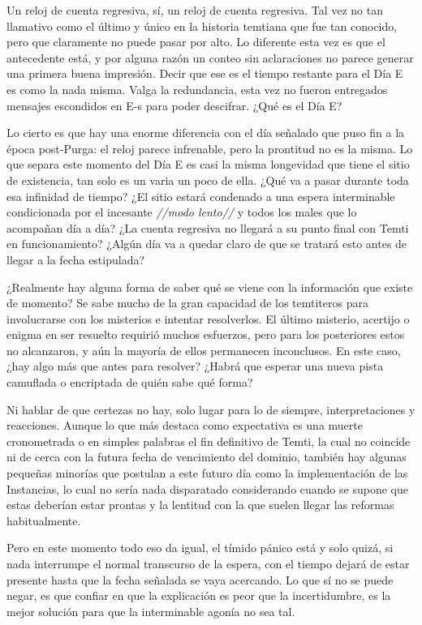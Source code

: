 \documentclass[
  spanish,
]{book}
\begin{document}
Un reloj de cuenta regresiva, sí, un reloj de cuenta regresiva. Tal vez no tan llamativo como el último y único en la historia temtiana que fue tan conocido, pero que claramente no puede pasar por alto. Lo diferente esta vez es que el antecedente está, y por alguna razón un conteo sin aclaraciones no parece generar una primera buena impresión. Decir que ese es el tiempo restante para el Día E es como la nada misma. Valga la redundancia, esta vez no fueron entregados mensajes escondidos en E-s para poder descifrar. ¿Qué es el Día E?

Lo cierto es que hay una enorme diferencia con el día señalado que puso fin a la época post-Purga: el reloj parece infrenable, pero la prontitud no es la misma. Lo que separa este momento del Día E es casi la misma longevidad que tiene el sitio de existencia, tan solo es un varia un poco de ella. ¿Qué va a pasar durante toda esa infinidad de tiempo? ¿El sitio estará condenado a una espera interminable condicionada por el incesante \emph{//modo lento//} y todos los males que lo acompañan día a día? ¿La cuenta regresiva no llegará a su punto final con Temti en funcionamiento? ¿Algún día va a quedar claro de que se tratará esto antes de llegar a la fecha estipulada?

¿Realmente hay alguna forma de saber qué se viene con la información que existe de momento? Se sabe mucho de la gran capacidad de los temtiteros para involucrarse con los misterios e intentar resolverlos. El último misterio, acertijo o enigma en ser resuelto requirió muchos esfuerzos, pero para los posteriores estos no alcanzaron, y aún la mayoría de ellos permanecen inconclusos. En este caso, ¿hay algo más que antes para resolver? ¿Habrá que esperar una nueva pista camuflada o encriptada de quién sabe qué forma?

Ni hablar de que certezas no hay, solo lugar para lo de siempre, interpretaciones y reacciones. Aunque lo que más destaca como expectativa es una muerte cronometrada o en simples palabras el fin definitivo de Temti, la cual no coincide ni de cerca con la futura fecha de vencimiento del dominio, también hay algunas pequeñas minorías que postulan a este futuro día como la implementación de las Instancias, lo cual no sería nada disparatado considerando cuando se supone que estas deberían estar prontas y la lentitud con la que suelen llegar las reformas habitualmente.

Pero en este momento todo eso da igual, el tímido pánico está y solo quizá, si nada interrumpe el normal transcurso de la espera, con el tiempo dejará de estar presente hasta que la fecha señalada se vaya acercando. Lo que sí no se puede negar, es que confiar en que la explicación es peor que la incertidumbre, es la mejor solución para que la interminable agonía no sea tal.
\end{document}
